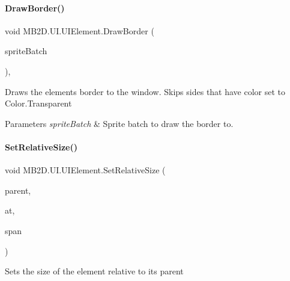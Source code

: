 \paragraph{\texorpdfstring{Draw\+Border()}{DrawBorder()}}
{\footnotesize\ttfamily void M\+B2\+D.\+U\+I.\+U\+I\+Element.\+Draw\+Border (\begin{DoxyParamCaption}\item[{Sprite\+Batch}]{sprite\+Batch }\end{DoxyParamCaption})\hspace{0.3cm}{\ttfamily [inline]}, {\ttfamily [protected]}}



Draws the elements border to the window. Skips sides that have color set to Color.\+Transparent 


\begin{DoxyParams}{Parameters}
{\em sprite\+Batch} & Sprite batch to draw the border to.\\
\hline
\end{DoxyParams}
\hypertarget{class_m_b2_d_1_1_u_i_1_1_u_i_element_a4c3d52b5993c5f1d6615d0535fdd9e19}{}\label{class_m_b2_d_1_1_u_i_1_1_u_i_element_a4c3d52b5993c5f1d6615d0535fdd9e19} 
\paragraph{\texorpdfstring{Set\+Relative\+Size()}{SetRelativeSize()}\hspace{0.1cm}{\footnotesize\ttfamily [1/2]}}
{\footnotesize\ttfamily void M\+B2\+D.\+U\+I.\+U\+I\+Element.\+Set\+Relative\+Size (\begin{DoxyParamCaption}\item[{\hyperlink{class_m_b2_d_1_1_u_i_1_1_u_i_content}{U\+I\+Content}}]{parent,  }\item[{Point}]{at,  }\item[{Point}]{span }\end{DoxyParamCaption})\hspace{0.3cm}{\ttfamily [inline]}}



Sets the size of the element relative to its parent 


